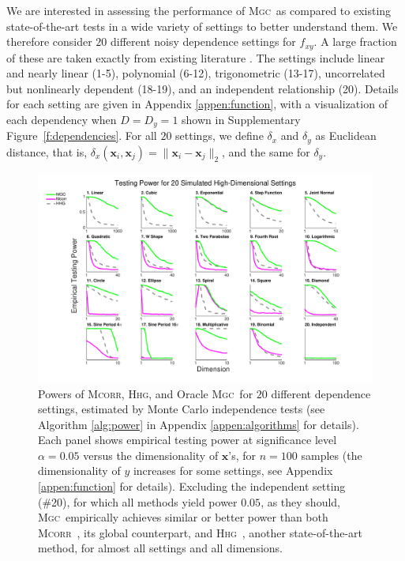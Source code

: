 \documentclass[11pt]{article}
\providecommand{\sct}[1]{{\normalfont\textsc{#1}}}
\providecommand{\mb}[1]{\boldsymbol{#1}}
\newcommand{\Mgc}{\sct{Mgc}}
\newcommand{\Hhg}{\sct{Hhg}}
\newcommand{\Mcorr}{\sct{Mcorr}}
\begin{document}
We are interested in assessing the performance of \Mgc~as compared to existing state-of-the-art tests in a wide variety of settings to better understand them.  
We therefore consider $20$ different  noisy dependence settings for $f_{xy}$. A large fraction of these are taken exactly from existing literature \cite{SzekelyRizzoBakirov2007, SimonTibshirani2012, GorfineHellerHeller2012, HellerGorfine2013}.  
The settings include
linear and nearly linear  (1-5),
polynomial   (6-12),
trigonometric (13-17),
uncorrelated but nonlinearly dependent  (18-19),
and an independent relationship (20).
Details for each setting are given in Appendix \ref{appen:function}, with a visualization of each dependency when $D=D_y=1$ shown in Supplementary Figure~\ref{f:dependencies}. For all $20$ settings, we define  $\delta_x$ and $\delta_y$  as  Euclidean distance, that is, $\delta_x(\mb{x}_i,\mb{x}_j) = \|\mb{x}_i - \mb{x}_j\|_{2}$, and the same for $\delta_y$.


\begin{figure}[htbp]
\includegraphics[width=1.0\textwidth]{Figures/FigHDPower}
\caption{Powers of \Mcorr, \Hhg, and Oracle \Mgc~for $20$ different dependence settings, estimated by Monte Carlo independence tests (see Algorithm \ref{alg:power} in Appendix \ref{appen:algorithms} for details).  
Each panel shows empirical testing power at significance level $\alpha=0.05$
%
%
%
%
%
versus the dimensionality of $\mb{x}$'s, for $n=100$ samples (the dimensionality of $y$ increases for some settings, see Appendix \ref{appen:function} for details). 
Excluding the independent  setting (\#20), for which all methods yield power $0.05$, as they should, \Mgc~empirically achieves similar or better power than both \Mcorr~\cite{SzekelyRizzo2013a}, its global counterpart, and \Hhg~\cite{HellerGorfine2013}, another state-of-the-art method, for almost all settings and all dimensions. 
}
\label{f:nD}
\end{figure}
\end{document}

